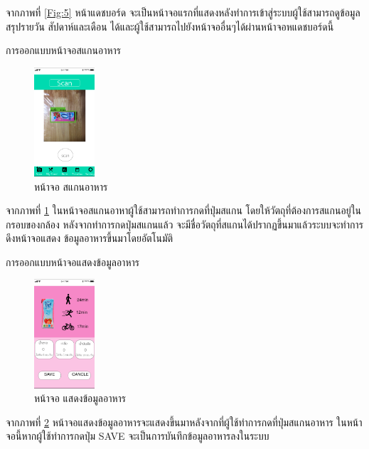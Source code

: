 							จากภาพที่ \ref{Fig:5} หน้าแดชบอร์ด จะเป็นหน้าจอแรกที่แสดงหลังทำการเข้าสู่ระบบผู้ใช้สามารถดูข้อมูลสรุปรายวัน สัปดาห์และเดือน ได้และผู้ใช้สามารถไปยังหน้าจออื่นๆได้ผ่านหน้าจอหแดชบอร์ดนี้
\item การออกแบบหน้าจอสแกนอาหาร
				\begin{figure}[H]
								\centering
								\includegraphics[width=0.2\textwidth]{Figures/3/UIDESIGN/4}
								\caption{หน้าจอ สแกนอาหาร}
								\label{Fig:4}
							\end{figure}
							จากภาพที่ \ref{Fig:4} ในหน้าจอสแกนอาหาผู้ใช้สามารถทำการกดที่ปุ่มสแกน โดยให้วัตถุที่ต้องการสแกนอยู่ในกรอบของกล้อง หลังจากทำการกดปุ่มสแกนแล้ว จะมีชื่อวัตถุที่สแกนได้ปรากฏขึ้นมาแล้วระบบจะทำการดึงหน้าจอแสดง
							ข้อมูลอาหารขึ้นมาโดยอัตโนมัติ 
							
							\item การออกแบบหน้าจอแสดงข้อมูลอาหาร 
	\begin{figure}[H]
					\centering
					\includegraphics[width=0.2\textwidth]{Figures/3/UIDESIGN/6}
					\caption{หน้าจอ แสดงข้อมูลอาหาร}
					\label{Fig:6}
				\end{figure}
				จากภาพที่ \ref{Fig:6} หน้าจอแสดงข้อมูลอาหารจะแสดงขึ้นมาหลังจากที่ผู้ใช้ทำการกดที่ปุ่มสแกนอาหาร ในหน้าจอนี้หากผู้ใช้ทำการกดปุ่ม SAVE จะเป็นการบันทึกข้อมูลอาหารลงในระบบ


